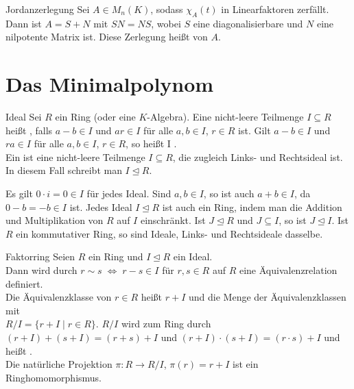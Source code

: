 \begin{Satz}{Jordanzerlegung}
    Sei $A \in M_n(K)$, sodass $\chi_A(t)$ in Linearfaktoren zerfällt. \\
    Dann ist $A = S + N$ mit $SN = NS$, wobei $S$ eine diagonalisierbare
    und $N$ eine nilpotente Matrix ist.
    Diese Zerlegung heißt  von $A$.
\end{Satz}

\section{%
    Das Minimalpolynom%
}

\begin{Def}{Ideal}
    Sei $R$ ein Ring (oder eine $K$-Algebra).
    Eine nicht-leere Teilmenge $I \subseteq R$ heißt ,
    falls $a - b \in I$ und $ar \in I$ für alle $a, b \in I$, $r \in R$ ist.
    Gilt $a - b \in I$ und $ra \in I$ für alle $a, b \in I$, $r \in R$,
    so heißt I . \\
    Ein  ist eine nicht-leere Teilmenge
    $I \subseteq R$, die zugleich Links- und Rechtsideal ist.
    In diesem Fall schreibt man $I \trianglelefteq R$.
\end{Def}

\begin{Bem}
    Es gilt $0 \cdot i = 0 \in I$ für jedes Ideal.
    Sind $a, b \in I$, so ist auch $a + b \in I$, da $0 - b = -b \in I$ ist.
    Jedes Ideal $I \trianglelefteq R$ ist auch ein Ring, indem man die
    Addition und Multiplikation von $R$ auf $I$ einschränkt.
    Ist $J \trianglelefteq R$ und $J \subseteq I$, so ist
    $J \trianglelefteq I$.
    Ist $R$ ein kommutativer Ring, so sind Ideale, Links- und Rechtsideale
    dasselbe.
\end{Bem}

\begin{Def}{Faktorring}
    Seien $R$ ein Ring und $I \trianglelefteq R$ ein Ideal. \\
    Dann wird durch $r \sim s \;\Leftrightarrow\; r - s \in I$
    für $r, s \in R$ auf $R$ eine Äquivalenzrelation definiert. \\
    Die Äquivalenzklasse von $r \in R$ heißt $r + I$ und
    die Menge der Äquivalenzklassen mit \\
    $R/I = \{r + I \;|\; r \in R\}$.
    $R/I$ wird zum Ring durch
    $(r + I) + (s + I) = (r + s) + I$ und
    $(r + I) \cdot (s + I) = (r \cdot s) + I$
    und heißt . \\
    Die natürliche Projektion $\pi: R \rightarrow R/I$, $\pi(r) = r + I$
    ist ein Ringhomomorphismus.
\end{Def}

